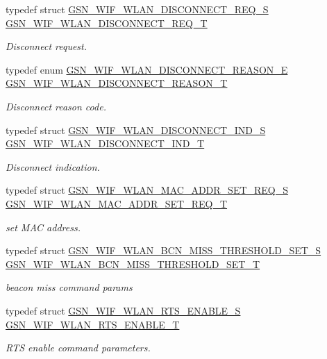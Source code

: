 \begin{DoxyCompactItemize}
typedef struct \hyperlink{a00380}{GSN\_\-WIF\_\-WLAN\_\-DISCONNECT\_\-REQ\_\-S} \hyperlink{a00677_gaf8a8c7854be001d295e7a84a9512a1d7}{GSN\_\-WIF\_\-WLAN\_\-DISCONNECT\_\-REQ\_\-T}
\begin{DoxyCompactList}\small\item\em Disconnect request. \end{DoxyCompactList}\item 
typedef enum \hyperlink{a00677_ga9dd854d0108dc49ff077a04e897e3518}{GSN\_\-WIF\_\-WLAN\_\-DISCONNECT\_\-REASON\_\-E} \hyperlink{a00677_ga59f311fc4d769ed3a162e48be5ea59aa}{GSN\_\-WIF\_\-WLAN\_\-DISCONNECT\_\-REASON\_\-T}
\begin{DoxyCompactList}\small\item\em Disconnect reason code. \end{DoxyCompactList}\item 
typedef struct \hyperlink{a00379}{GSN\_\-WIF\_\-WLAN\_\-DISCONNECT\_\-IND\_\-S} \hyperlink{a00677_ga12e53679e526d82e7e99a05a000dbdf8}{GSN\_\-WIF\_\-WLAN\_\-DISCONNECT\_\-IND\_\-T}
\begin{DoxyCompactList}\small\item\em Disconnect indication. \end{DoxyCompactList}\item 
typedef struct \hyperlink{a00388}{GSN\_\-WIF\_\-WLAN\_\-MAC\_\-ADDR\_\-SET\_\-REQ\_\-S} \hyperlink{a00677_ga013826a17b7a57eb4c9e4de16a91b6a7}{GSN\_\-WIF\_\-WLAN\_\-MAC\_\-ADDR\_\-SET\_\-REQ\_\-T}
\begin{DoxyCompactList}\small\item\em set MAC address. \end{DoxyCompactList}\item 
typedef struct \hyperlink{a00372}{GSN\_\-WIF\_\-WLAN\_\-BCN\_\-MISS\_\-THRESHOLD\_\-SET\_\-S} \hyperlink{a00677_ga3804a62776c49cf6cd5522262eb81695}{GSN\_\-WIF\_\-WLAN\_\-BCN\_\-MISS\_\-THRESHOLD\_\-SET\_\-T}
\begin{DoxyCompactList}\small\item\em beacon miss command params \end{DoxyCompactList}\item 
typedef struct \hyperlink{a00396}{GSN\_\-WIF\_\-WLAN\_\-RTS\_\-ENABLE\_\-S} \hyperlink{a00677_ga7629340b77de2ac1d56c6aa8c8013d47}{GSN\_\-WIF\_\-WLAN\_\-RTS\_\-ENABLE\_\-T}
\begin{DoxyCompactList}\small\item\em RTS enable command parameters. \end{DoxyCompactList}\item 

\end{DoxyCompactItemize}
